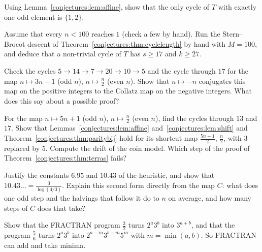 \begin{exercise}[$\star\star$]\label{conjectures:ex:oneodd}
Using Lemma~\ref{conjectures:lem:affine}, show that the only cycle of $T$ with exactly one odd element is $\{1,2\}$.
\end{exercise}

\begin{exercise}[$\star\star$]\label{conjectures:ex:cyclesmall}
Assume that every $n<100$ reaches $1$ (check a few by hand). Run the Stern--Brocot descent of Theorem~\ref{conjectures:thm:cyclelength} by hand with $M=100$, and deduce
that a non-trivial cycle of $T$ has $s\ge17$ and $k\ge27$.
\end{exercise}

\begin{exercise}[$\star$]\label{conjectures:ex:minusone}
Check the cycles $5\to14\to7\to20\to10\to5$ and the cycle through $17$ for the map $n\mapsto3n-1$ (odd $n$), $n\mapsto\frac n2$ (even $n$). Show that
$n\mapsto-n$ conjugates this map on the positive integers to the Collatz map on the negative integers. What does this say about a possible proof?
\end{exercise}

\begin{exercise}[$\star\star$]\label{conjectures:ex:fiveone}
For the map $n\mapsto5n+1$ (odd $n$), $n\mapsto\frac n2$ (even $n$), find the cycles through $13$ and $17$. Show that Lemmas~\ref{conjectures:lem:affine}
and~\ref{conjectures:lem:shift} and Theorem~\ref{conjectures:thm:paritybij} hold for its shortcut map $\frac{5n+1}2$, $\frac n2$, with $3$ replaced by $5$. Compute the drift of the
coin model. Which step of the proof of Theorem~\ref{conjectures:thm:terras} fails?
\end{exercise}

\begin{exercise}[$\star$]\label{conjectures:ex:drift}
Justify the constants $6.95$ and $10.43$ of the heuristic, and show that $10.43\ldots=\frac3{\log(4/3)}$. Explain this second form directly from the map
$C$: what does one odd step and the halvings that follow it do to $n$ on average, and how many steps of $C$ does that take?
\end{exercise}

\begin{exercise}[$\star$]\label{conjectures:ex:fractran}
Show that the FRACTRAN program $\frac32$ turns $2^a3^b$ into $3^{a+b}$, and that the program $\frac5{6}$ turns $2^a3^b$ into
$2^{a-m}3^{b-m}5^m$ with $m=\min(a,b)$. So FRACTRAN can add and take minima.
\end{exercise}

